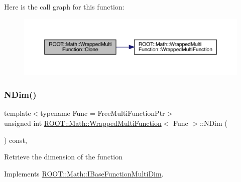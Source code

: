 Here is the call graph for this function\+:
\nopagebreak
\begin{figure}[H]
\begin{center}
\leavevmode
\includegraphics[width=350pt]{de/da4/classROOT_1_1Math_1_1WrappedMultiFunction_aafa24e359a607b4278f1bf238bdbc336_cgraph}
\end{center}
\end{figure}
\mbox{\label{classROOT_1_1Math_1_1WrappedMultiFunction_a99de9f7a6e26b03b1cdcf35d8c62d761}} 
\subsubsection{\texorpdfstring{NDim()}{NDim()}\hspace{0.1cm}{\footnotesize\ttfamily [1/3]}}
{\footnotesize\ttfamily template$<$typename Func  = Free\+Multi\+Function\+Ptr$>$ \\
unsigned int \mbox{\hyperlink{classROOT_1_1Math_1_1WrappedMultiFunction}{R\+O\+O\+T\+::\+Math\+::\+Wrapped\+Multi\+Function}}$<$ Func $>$\+::N\+Dim (\begin{DoxyParamCaption}{ }\end{DoxyParamCaption}) const\hspace{0.3cm}{\ttfamily [inline]}, {\ttfamily [virtual]}}

Retrieve the dimension of the function 

Implements \mbox{\hyperlink{classROOT_1_1Math_1_1IBaseFunctionMultiDim_a16f37dc7a6d00c75ddeda0697741315d}{R\+O\+O\+T\+::\+Math\+::\+I\+Base\+Function\+Multi\+Dim}}.

\mbox{\label{classROOT_1_1Math_1_1WrappedMultiFunction_a99de9f7a6e26b03b1cdcf35d8c62d761}} 
